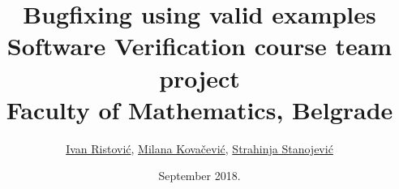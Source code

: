 \documentclass[a4paper]{article}
\theoremstyle{plain}
\theoremstyle{definition}
\begin{document}
\title{Bugfixing using valid examples\\ \small{Software Verification course team project\\Faculty of Mathematics, Belgrade}}

\author{\href{mailto:mi14031@matf.bg.ac.rs}{Ivan Ristović}, \href{mailto:mi14042@matf.bg.ac.rs}{Milana Kovačević}, \href{mailto:mi14207@matf.bg.ac.rs}{Strahinja Stanojević}}
\date{September 2018.}

\maketitle

\setcounter{tocdepth}{1}



\tableofcontents
\newpage










%
\end{document}
